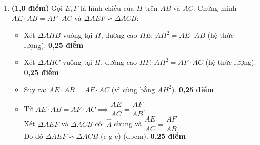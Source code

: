 \documentclass[12pt,a4paper]{article}
\begin{document}
\begin{enumerate}[label=\alph*), leftmargin=16pt, itemsep=2pt, parsep=0pt, start=2]
  \item \textbf{(1,0 điểm)} Gọi $E, F$ là hình chiếu của $H$ trên $AB$ và $AC$. Chứng minh $AE \cdot AB = AF \cdot AC$ và $\Delta AEF \backsim \Delta ACB$:
  \begin{itemize}[leftmargin=16pt, itemsep=1.5pt, parsep=0pt]
    \item Xét $\Delta AHB$ vuông tại $H$, đường cao $HE$: $AH^2 = AE \cdot AB$ (hệ thức lượng). \dotfill \textbf{0,25 điểm}
    \item Xét $\Delta AHC$ vuông tại $H$, đường cao $HF$: $AH^2 = AF \cdot AC$ (hệ thức lượng). \dotfill \textbf{0,25 điểm}
    \item Suy ra: $AE \cdot AB = AF \cdot AC$ (vì cùng bằng $AH^2$). \dotfill \textbf{0,25 điểm}
    \item Từ $AE \cdot AB = AF \cdot AC \implies \dfrac{AE}{AC} = \dfrac{AF}{AB}$.\\
    Xét $\Delta AEF$ và $\Delta ACB$ có: $\widehat{A}$ chung và $\dfrac{AE}{AC} = \dfrac{AF}{AB}$.\\
    Do đó $\Delta AEF \backsim \Delta ACB$ (c-g-c) (đpcm). \dotfill \textbf{0,25 điểm}
  \end{itemize}
\end{enumerate}

\newpage
\end{document}
